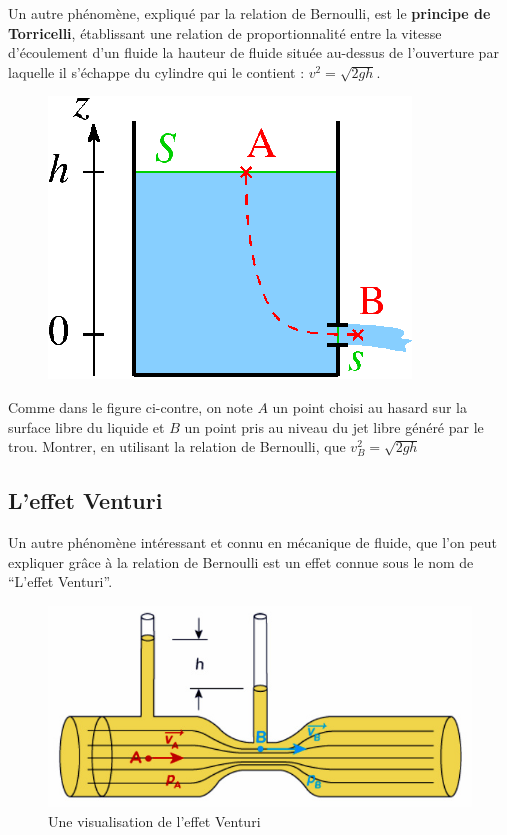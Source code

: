 \documentclass[11pt,a4paper]{article}
\begin{document}
Un autre phénomène, expliqué par la relation de Bernoulli, est le \textbf{principe de Torricelli}, établissant une relation de proportionnalité entre la vitesse d'écoulement d'un fluide la hauteur de fluide située au-dessus de l'ouverture par laquelle il s'échappe du cylindre qui le contient : $v^2 = \sqrt{2gh}$. 

\begin{exo}

\begin{figure}
    \centering
    \includegraphics[width=0.9\linewidth]{imgs/p9/Torricelli.png}
\end{figure}
Comme dans le figure ci-contre, on note $A$ un point choisi au hasard sur la surface libre du liquide et $B$ un point pris au niveau du jet libre généré par le trou. Montrer, en utilisant la relation de Bernoulli, que $v_B^2=\sqrt{2gh}$
\vspace{5cm}
\end{exo}

\subsection{L'effet Venturi}

Un autre phénomène intéressant et connu en mécanique de fluide, que l'on peut expliquer grâce à la relation de Bernoulli est un effet connue sous le nom de ``L'effet Venturi''. 

\begin{figure}[H]
    \centering
    \includegraphics[width=0.6\linewidth]{imgs/p9/venturi.jpg}
    \caption{Une visualisation de l'effet Venturi}
    \label{fig:venturi}
\end{figure}
\end{document}
